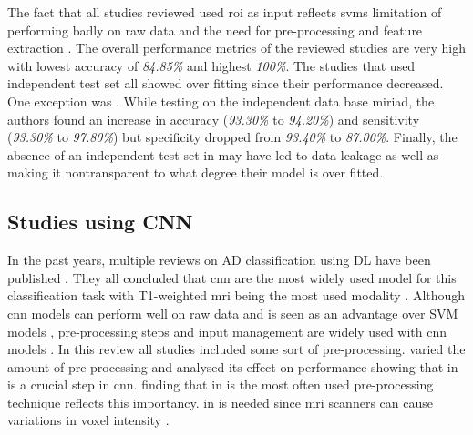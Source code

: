 The fact that all studies reviewed used \gls{roi} as input reflects \gls{svm}s limitation of performing badly on raw data and the need for pre-processing and feature extraction \autocite{vieiraUsingDeepLearning2017}. 
The overall performance metrics of the reviewed studies are very high with lowest accuracy of \textit{84.85\%} and highest \textit{100\%}. The studies that used independent test set all showed over fitting since their performance decreased. One exception was \textcite{syaifullahMachineLearningDiagnosis2021}. While testing on the independent data base \gls{miriad}, the authors found an increase in accuracy (\textit{93.30\%} to \textit{94.20\%}) and sensitivity (\textit{93.30\%} to \textit{97.80\%}) but specificity dropped from \textit{93.40\%} to \textit{87.00\%}. Finally, the absence of an independent test set in \textcite{akramifardEmphasisLearningFeatures2020} may have led to data leakage as well as making it nontransparent to what degree their model is over fitted.



\subsection{Studies using CNN}
In the past years, multiple reviews on \gls{AD} classification using \gls{DL} have been published \autocite[see][]{wenConvolutionalNeuralNetworks2020,ebrahimighahnaviehDeepLearningDetect2020, joDeepLearningAlzheimer2019,tanveerMachineLearningTechniques2020,noorApplicationDeepLearning2020}. They all concluded that \gls{cnn} are the most widely used model for this classification task with T1-weighted \gls{mri} being the most used modality \autocite{tanveerMachineLearningTechniques2020}. Although \gls{cnn} models can perform well on raw data \autocite{lecunDeepLearning2015a} and is seen as an advantage over SVM models \autocite{joDeepLearningAlzheimer2019}, pre-processing steps and input management are widely used with \gls{cnn} models \autocite{ebrahimighahnaviehDeepLearningDetect2020}. In this review all studies included some sort of pre-processing. \textcite{wenConvolutionalNeuralNetworks2020} varied the amount of pre-processing and analysed its effect on performance showing that \acrlong{in} is a crucial step in \gls{cnn}. \textcite{ebrahimighahnaviehDeepLearningDetect2020} finding that \gls{in} is the most often used pre-processing technique reflects this importancy. \gls{in} is needed since \gls{mri} scanners can cause variations in voxel intensity \autocite{noorApplicationDeepLearning2020}. 

